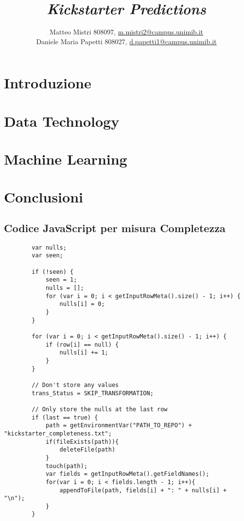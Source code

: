 \documentclass[11pt, a4paper]{report}
\title{\emph{Kickstarter Predictions}}
\author{Matteo Mistri 808097, \href{m.mistri2@campus.unimib.it}{m.mistri2@campus.unimib.it}\\%
	Daniele Maria Papetti 808027, \href{d.papetti1@campus.unimib.it}{d.papetti1@campus.unimib.it}}
\begin{document}
	
\clearpage
\maketitle


\tableofcontents
\newpage

\hypersetup{pdfborder = 0 0 0, 	colorlinks, urlcolor=blue, linkcolor=black}
\setcounter{page}{1}
\chapter{Introduzione}

\chapter{Data Technology}

\chapter{Machine Learning}

\chapter{Conclusioni}

\begin{appendices}
	\chapter{Codice JavaScript per misura Completezza}
	\begin{lstlisting}
		var nulls;
		var seen;
		
		if (!seen) {
			seen = 1;
			nulls = [];
			for (var i = 0; i < getInputRowMeta().size() - 1; i++) {
				nulls[i] = 0;
			}
		}
		
		for (var i = 0; i < getInputRowMeta().size() - 1; i++) {
			if (row[i] == null) {
				nulls[i] += 1;
			}
		}
		
		// Don't store any values
		trans_Status = SKIP_TRANSFORMATION;
		
		// Only store the nulls at the last row
		if (last == true) {
			path = getEnvironmentVar("PATH_TO_REPO") + "kickstarter_completeness.txt";
			if(fileExists(path)){
				deleteFile(path)
			}
			touch(path);
			var fields = getInputRowMeta().getFieldNames();
			for(var i = 0; i < fields.length - 1; i++){
				appendToFile(path, fields[i] + ": " + nulls[i] + "\n");
			}
		}
	\end{lstlisting}
\end{appendices}
\end{document}
